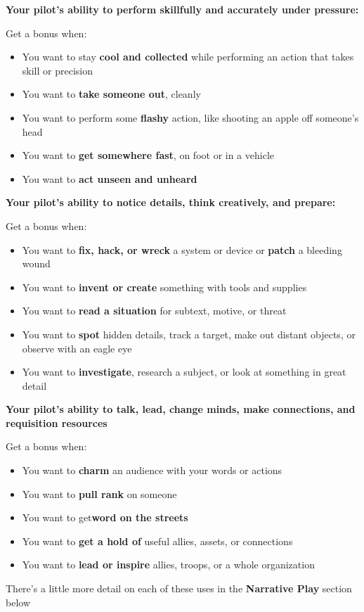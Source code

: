 \textbf{Your pilot’s ability to perform skillfully and accurately under pressure:}

Get a bonus when:
\begin{itemize}
\item You want to stay \textbf{cool and collected} while performing an action that takes skill or precision
\item You want to \textbf{take someone out}, cleanly
\item You want to perform some \textbf{flashy} action, like shooting an apple off someone’s head
\item You want to \textbf{get somewhere fast}, on foot or in a vehicle
\item You want to \textbf{act unseen and unheard}
\end{itemize}  

\textbf{Your pilot’s ability to notice details, think creatively, and prepare:}

Get a bonus when:
\begin{itemize}
\item You want to \textbf{fix, hack, or wreck} a system or device or \textbf{patch} a bleeding wound
\item You want to \textbf{invent or create} something with tools and supplies
\item You want to \textbf{read a situation} for subtext, motive, or threat
\item You want to \textbf{spot} hidden details, track a target, make out distant objects, or observe with an eagle eye
\item You want to \textbf{investigate}, research a subject, or look at something in great detail
\end{itemize}  

\textbf{Your pilot’s ability to talk, lead, change minds, make connections, and requisition resources}

Get a bonus when:
\begin{itemize}
\item You want to \textbf{charm} an audience with your words or actions
\item You want to \textbf{pull rank} on someone
\item You want to get\textbf{word on the streets}
\item You want to \textbf{get a hold of} useful allies, assets, or connections
\item You want to \textbf{lead or inspire} allies, troops, or a whole organization
\end{itemize}  

There’s a little more detail on each of these uses in the \textbf{Narrative Play} section below